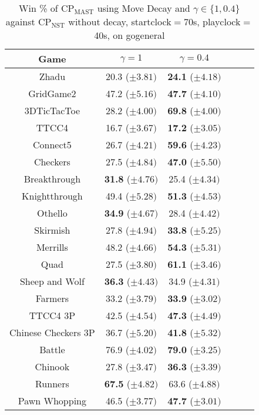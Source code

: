 \documentclass[journal]{IEEEtran}
\begin{document}
\begin{table}[h!]
\caption{Win \% of CP$_{\textrm{MAST}}$ using Move Decay and $\gamma \in \{1,0.4\}$ against CP$_{\textrm{NST}}$ without decay, startclock$=$70s, playclock$=$40s, on gogeneral}
\label{table:expMastvsNST}
\centering
\begin{tabular}{|c|c|c|c|c|c|}
\hline
 \textbf{Game} & $ \gamma = 1$ & $ \gamma = 0.4$\\
\hline\hline
Zhadu & 20.3 ($\pm 3.81)$ & \textbf{24.1} ($\pm 4.18)$ \\ 
GridGame2 & 47.2 ($\pm 5.16)$ & \textbf{47.7} ($\pm 4.10)$   \\ 
3DTicTacToe & 28.2 ($\pm 4.00)$ & \textbf{69.8} ($\pm 4.00)$   \\ 
TTCC4 & 16.7 ($\pm 3.67)$ & \textbf{17.2} ($\pm 3.05)$ \\ 
Connect5 & 26.7 ($\pm 4.21)$ & \textbf{59.6} ($\pm 4.23)$  \\ 
Checkers & 27.5 ($\pm 4.84)$ & \textbf{47.0} ($\pm 5.50)$   \\ 
Breakthrough & \textbf{31.8} ($\pm 4.76)$ & 25.4 ($\pm 4.34)$   \\ 
Knightthrough & 49.4 ($\pm 5.28)$ & \textbf{51.3} ($\pm 4.53)$   \\ 
Othello & \textbf{34.9} ($\pm 4.67)$ & 28.4 ($\pm 4.42)$   \\ 
Skirmish & 27.8 ($\pm 4.94)$ & \textbf{33.8} ($\pm 5.25)$  \\ 
Merrills & 48.2 ($\pm 4.66)$ & \textbf{54.3} ($\pm 5.31)$  \\ 
Quad & 27.5 ($\pm 3.80)$ & \textbf{61.1} ($\pm 3.46)$   \\ 
Sheep and Wolf & \textbf{36.3} ($\pm 4.43)$ & 34.9 ($\pm 4.31)$   \\ 
\hline
Farmers & 33.2 ($\pm 3.79)$ & \textbf{33.9} ($\pm 3.02)$  \\ 
TTCC4 3P & 42.5 ($\pm 4.54)$ & \textbf{47.3} ($\pm 4.49)$  \\ 
Chinese Checkers 3P & 36.7 ($\pm 5.20)$ & \textbf{41.8} ($\pm 5.32)$  \\ 
\hline
Battle & 76.9 ($\pm 4.02)$ & \textbf{79.0} ($\pm 3.25)$  \\ 
Chinook & 27.8 ($\pm 3.47)$ & \textbf{36.3} ($\pm 3.39)$  \\ 
Runners & \textbf{67.5} ($\pm 4.82)$ & 63.6 ($\pm 4.88)$  \\ 
Pawn Whopping & 46.5 ($\pm 3.77)$ & \textbf{47.7} ($\pm 3.01)$  \\ \hline
\end{tabular}
\end{table}
\end{document}
